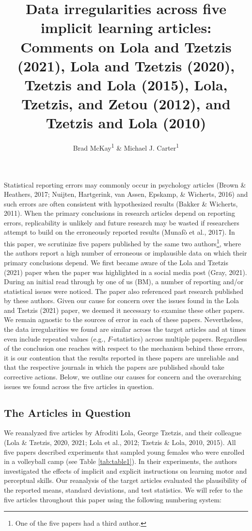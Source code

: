 \documentclass[
  english,
  man, donotrepeattitle,floatsintext]{apa7}
\title{Data irregularities across five implicit learning articles: Comments on Lola and Tzetzis (2021), Lola and Tzetzis (2020), Tzetzis and Lola (2015), Lola, Tzetzis, and Zetou (2012), and Tzetzis and Lola (2010)}
\author{Brad McKay\textsuperscript{1} \& Michael J. Carter\textsuperscript{1}}
\date{}
\affiliation{\vspace{0.5cm}\textsuperscript{1} Department of Kinesiology, McMaster University}
\begin{document}
\maketitle

Statistical reporting errors may commonly occur in psychology articles (Brown \& Heathers, 2017; Nuijten, Hartgerink, van Assen, Epskamp, \& Wicherts, 2016) and such errors are often consistent with hypothesized results (Bakker \& Wicherts, 2011). When the primary conclusions in research articles depend on reporting errors, replicability is unlikely and future research may be wasted if researchers attempt to build on the erroneously reported results (Munafò et al., 2017). In this paper, we scrutinize five papers published by the same two authors\footnote{One of the five papers had a third author.}, where the authors report a high number of erroneous or implausible data on which their primary conclusions depend. We first became aware of the Lola and Tzetzis (2021) paper when the paper was highlighted in a social media post (Gray, 2021). During an initial read through by one of us (BM), a number of reporting and/or statistical issues were noticed. The paper also referenced past research published by these authors. Given our cause for concern over the issues found in the Lola and Tzetzis (2021) paper, we deemed it necessary to examine these other papers. We remain agnostic to the sources of error in each of these papers. Nevertheless, the data irregularities we found are similar across the target articles and at times even include repeated values (e.g., \(F\)-statistics) across multiple papers. Regardless of the conclusion one reaches with respect to the mechanism behind these errors, it is our contention that the results reported in these papers are unreliable and that the respective journals in which the papers are published should take corrective actions. Below, we outline our causes for concern and the overarching issues we found across the five articles in question.

\hypertarget{the-articles-in-question}{%
\subsection{The Articles in Question}\label{the-articles-in-question}}

We reanalyzed five articles by Afroditi Lola, George Tzetzis, and their colleague (Lola \& Tzetzis, 2020, 2021; Lola et al., 2012; Tzetzis \& Lola, 2010, 2015). All five papers described experiments that sampled young females who were enrolled in a volleyball camp (see Table \ref{tab:table1}). In their experiments, the authors investigated the effects of implicit and explicit instructions on learning motor and perceptual skills. Our reanalysis of the target articles evaluated the plausibility of the reported means, standard deviations, and test statistics. We will refer to the five articles throughout this paper using the following numbering system:
\end{document}
